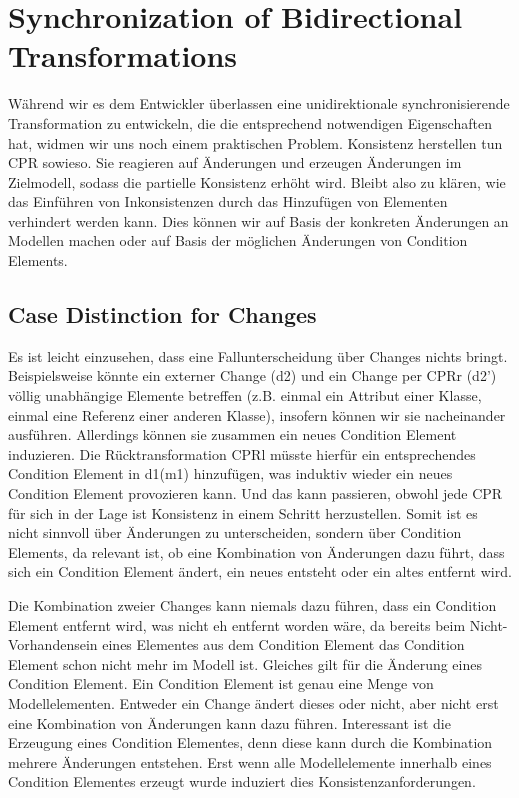 \section{Synchronization of Bidirectional Transformations}
Während wir es dem Entwickler überlassen eine unidirektionale synchronisierende Transformation zu entwickeln, die die entsprechend notwendigen Eigenschaften hat, widmen wir uns noch einem praktischen Problem.
Konsistenz herstellen tun CPR sowieso. Sie reagieren auf Änderungen und erzeugen Änderungen im Zielmodell, sodass die partielle Konsistenz erhöht wird.
Bleibt also zu klären, wie das Einführen von Inkonsistenzen durch das Hinzufügen von Elementen verhindert werden kann.
Dies können wir auf Basis der konkreten Änderungen an Modellen machen oder auf Basis der möglichen Änderungen von Condition Elements.

\subsection{Case Distinction for Changes}
Es ist leicht einzusehen, dass eine Fallunterscheidung über Changes nichts bringt.
Beispielsweise könnte ein externer Change (d2) und ein Change per CPRr (d2') völlig unabhängige Elemente betreffen (z.B. einmal ein Attribut einer Klasse, einmal eine Referenz einer anderen Klasse), insofern können wir sie nacheinander ausführen. Allerdings können sie zusammen ein neues Condition Element induzieren. Die Rücktransformation CPRl müsste hierfür ein entsprechendes Condition Element in d1(m1) hinzufügen, was induktiv wieder ein neues Condition Element provozieren kann.
Und das kann passieren, obwohl jede CPR für sich in der Lage ist Konsistenz in einem Schritt herzustellen.
Somit ist es nicht sinnvoll über Änderungen zu unterscheiden, sondern über Condition Elements, da relevant ist, ob eine Kombination von Änderungen dazu führt, dass sich ein Condition Element ändert, ein neues entsteht oder ein altes entfernt wird.

Die Kombination zweier Changes kann niemals dazu führen, dass ein Condition Element entfernt wird, was nicht eh entfernt worden wäre, da bereits beim Nicht-Vorhandensein eines Elementes aus dem Condition Element das Condition Element schon nicht mehr im Modell ist.
Gleiches gilt für die Änderung eines Condition Element. Ein Condition Element ist genau eine Menge von Modellelementen. Entweder ein Change ändert dieses oder nicht, aber nicht erst eine Kombination von Änderungen kann dazu führen.
Interessant ist die Erzeugung eines Condition Elementes, denn diese kann durch die Kombination mehrere Änderungen entstehen. Erst wenn alle Modellelemente innerhalb eines Condition Elementes erzeugt wurde induziert dies Konsistenzanforderungen.

